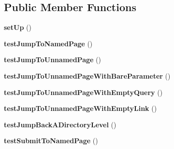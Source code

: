 \subsection*{Public Member Functions}
\begin{DoxyCompactItemize}
\item 
\hypertarget{class_test_of_live_front_controller_emulation_a9bb260af123800bc4d33342a068b0315}{
{\bfseries setUp} ()}
\label{class_test_of_live_front_controller_emulation_a9bb260af123800bc4d33342a068b0315}

\item 
\hypertarget{class_test_of_live_front_controller_emulation_aaf3b05348829897cf50a919bc6d7851c}{
{\bfseries testJumpToNamedPage} ()}
\label{class_test_of_live_front_controller_emulation_aaf3b05348829897cf50a919bc6d7851c}

\item 
\hypertarget{class_test_of_live_front_controller_emulation_aa6f055e3f68f3c2835d852b3debef41c}{
{\bfseries testJumpToUnnamedPage} ()}
\label{class_test_of_live_front_controller_emulation_aa6f055e3f68f3c2835d852b3debef41c}

\item 
\hypertarget{class_test_of_live_front_controller_emulation_acf6a5579e88da7ef53ff35f4fd2c63bd}{
{\bfseries testJumpToUnnamedPageWithBareParameter} ()}
\label{class_test_of_live_front_controller_emulation_acf6a5579e88da7ef53ff35f4fd2c63bd}

\item 
\hypertarget{class_test_of_live_front_controller_emulation_a4f472751e6f9c70a53276ee1b636c5a3}{
{\bfseries testJumpToUnnamedPageWithEmptyQuery} ()}
\label{class_test_of_live_front_controller_emulation_a4f472751e6f9c70a53276ee1b636c5a3}

\item 
\hypertarget{class_test_of_live_front_controller_emulation_a79a8976ff70a8a991d78c53c848a3aea}{
{\bfseries testJumpToUnnamedPageWithEmptyLink} ()}
\label{class_test_of_live_front_controller_emulation_a79a8976ff70a8a991d78c53c848a3aea}

\item 
\hypertarget{class_test_of_live_front_controller_emulation_aba3338f6b014fb7b7ccb7065dd0ed641}{
{\bfseries testJumpBackADirectoryLevel} ()}
\label{class_test_of_live_front_controller_emulation_aba3338f6b014fb7b7ccb7065dd0ed641}

\item 
\hypertarget{class_test_of_live_front_controller_emulation_ad30678e026203689a8b3a522146b333d}{
{\bfseries testSubmitToNamedPage} ()}
\label{class_test_of_live_front_controller_emulation_ad30678e026203689a8b3a522146b333d}


\end{DoxyCompactItemize}
